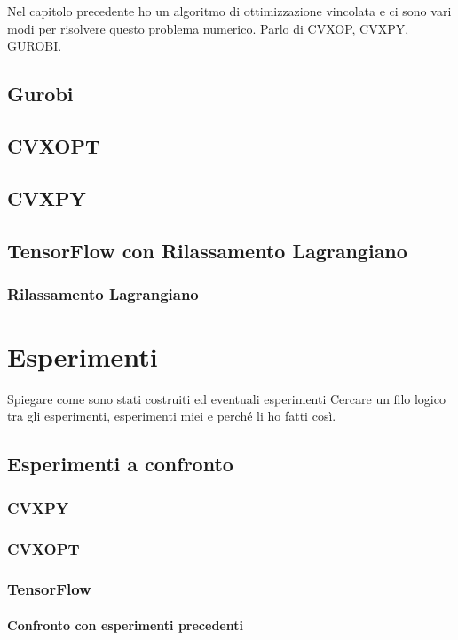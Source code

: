 \documentclass[a4paper,12pt]{report}
\begin{document}
Nel capitolo precedente ho un algoritmo di ottimizzazione vincolata e ci sono vari modi per risolvere questo problema numerico.
Parlo di CVXOP, CVXPY, GUROBI.

\section{Gurobi}
\section{CVXOPT}
\section{CVXPY}
\section{TensorFlow con Rilassamento Lagrangiano}
\subsection{Rilassamento Lagrangiano}

%

\chapter{Esperimenti}
\label{Captiolo 3}

Spiegare come sono stati costruiti ed eventuali esperimenti
Cercare un filo logico tra gli esperimenti, esperimenti miei e perché li ho fatti così.
\section{Esperimenti a confronto}
\subsection{CVXPY}
\subsection{CVXOPT}
\subsection{TensorFlow}
\subsubsection{Confronto con esperimenti precedenti}
\end{document}
